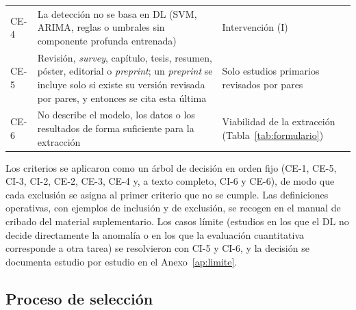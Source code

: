 \documentclass[12pt, a4paper]{article}
\begin{document}
\begin{table}[H]
\begin{tabularx}{\linewidth}{lYP{3.4cm}}
CE-4 & La detecci\'{o}n no se basa en DL (SVM, ARIMA, reglas o umbrales sin componente profunda entrenada) & Intervenci\'{o}n (I) \\
CE-5 & Revisi\'{o}n, \textit{survey}, cap\'{i}tulo, tesis, resumen, p\'{o}ster, editorial o \textit{preprint}; un \textit{preprint} se incluye solo si existe su versi\'{o}n revisada por pares, y entonces se cita esta \'{u}ltima & Solo estudios primarios revisados por pares \\
CE-6 & No describe el modelo, los datos o los resultados de forma suficiente para la extracci\'{o}n & Viabilidad de la extracci\'{o}n (Tabla~\ref{tab:formulario}) \\
\bottomrule
\end{tabularx}
\end{table}

Los criterios se aplicaron como un \'{a}rbol de decisi\'{o}n en orden fijo (CE-1, CE-5, CI-3, CI-2, CE-2, CE-3, CE-4 y, a texto completo, CI-6 y CE-6), de modo que cada exclusi\'{o}n se asigna al primer criterio que no se cumple. Las definiciones operativas, con ejemplos de inclusi\'{o}n y de exclusi\'{o}n, se recogen en el manual de cribado del material suplementario. Los casos l\'{i}mite (estudios en los que el DL no decide directamente la anomal\'{i}a o en los que la evaluaci\'{o}n cuantitativa corresponde a otra tarea) se resolvieron con CI-5 y CI-6, y la decisi\'{o}n se documenta estudio por estudio en el Anexo~\ref{ap:limite}.

\subsection{Proceso de selecci\'{o}n}
\end{document}
